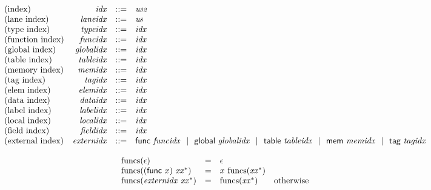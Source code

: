 $$
\begin{array}[t]{@{}lrrl@{}l@{}}
\mbox{(index)} & {\mathit{idx}} & ::= & {\mathit{u{\kern-0.1em\scriptstyle 32}}} \\
\mbox{(lane index)} & {\mathit{laneidx}} & ::= & {\mathit{u{\kern-0.1em\scriptstyle 8}}} \\
\mbox{(type index)} & {\mathit{typeidx}} & ::= & {\mathit{idx}} \\
\mbox{(function index)} & {\mathit{funcidx}} & ::= & {\mathit{idx}} \\
\mbox{(global index)} & {\mathit{globalidx}} & ::= & {\mathit{idx}} \\
\mbox{(table index)} & {\mathit{tableidx}} & ::= & {\mathit{idx}} \\
\mbox{(memory index)} & {\mathit{memidx}} & ::= & {\mathit{idx}} \\
\mbox{(tag index)} & {\mathit{tagidx}} & ::= & {\mathit{idx}} \\
\mbox{(elem index)} & {\mathit{elemidx}} & ::= & {\mathit{idx}} \\
\mbox{(data index)} & {\mathit{dataidx}} & ::= & {\mathit{idx}} \\
\mbox{(label index)} & {\mathit{labelidx}} & ::= & {\mathit{idx}} \\
\mbox{(local index)} & {\mathit{localidx}} & ::= & {\mathit{idx}} \\
\mbox{(field index)} & {\mathit{fieldidx}} & ::= & {\mathit{idx}} \\
\mbox{(external index)} & {\mathit{externidx}} & ::= & \mathsf{func}~{\mathit{funcidx}} ~~|~~ \mathsf{global}~{\mathit{globalidx}} ~~|~~ \mathsf{table}~{\mathit{tableidx}} ~~|~~ \mathsf{mem}~{\mathit{memidx}} ~~|~~ \mathsf{tag}~{\mathit{tagidx}} \\
\end{array}
$$

\vspace{1ex}

\vspace{1ex}

$$
\begin{array}[t]{@{}lcl@{}l@{}}
{\mathrm{funcs}}(\epsilon) & = & \epsilon \\
{\mathrm{funcs}}((\mathsf{func}~x)~{{\mathit{xx}}^\ast}) & = & x~{\mathrm{funcs}}({{\mathit{xx}}^\ast}) \\
{\mathrm{funcs}}({\mathit{externidx}}~{{\mathit{xx}}^\ast}) & = & {\mathrm{funcs}}({{\mathit{xx}}^\ast}) & \quad \mbox{otherwise} \\
\end{array}
$$

